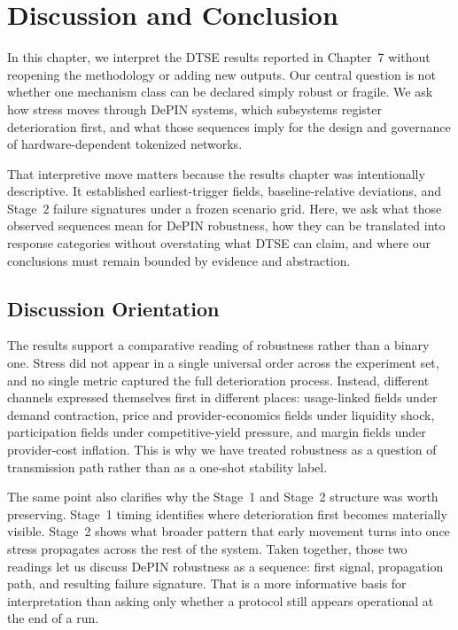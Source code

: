 \section{Discussion and Conclusion}
\label{sec:discussion}

In this chapter, we interpret the DTSE results reported in Chapter~7 without reopening the methodology or adding new outputs. Our central question is not whether one mechanism class can be declared simply robust or fragile. We ask how stress moves through DePIN systems, which subsystems register deterioration first, and what those sequences imply for the design and governance of hardware-dependent tokenized networks.

That interpretive move matters because the results chapter was intentionally descriptive. It established earliest-trigger fields, baseline-relative deviations, and Stage~2 failure signatures under a frozen scenario grid. Here, we ask what those observed sequences mean for DePIN robustness, how they can be translated into response categories without overstating what DTSE can claim, and where our conclusions must remain bounded by evidence and abstraction.

\subsection{Discussion Orientation}
The results support a comparative reading of robustness rather than a binary one. Stress did not appear in a single universal order across the experiment set, and no single metric captured the full deterioration process. Instead, different channels expressed themselves first in different places: usage-linked fields under demand contraction, price and provider-economics fields under liquidity shock, participation fields under competitive-yield pressure, and margin fields under provider-cost inflation. This is why we have treated robustness as a question of transmission path rather than as a one-shot stability label.

The same point also clarifies why the Stage~1 and Stage~2 structure was worth preserving. Stage~1 timing identifies where deterioration first becomes materially visible. Stage~2 shows what broader pattern that early movement turns into once stress propagates across the rest of the system. Taken together, those two readings let us discuss DePIN robustness as a sequence: first signal, propagation path, and resulting failure signature. That is a more informative basis for interpretation than asking only whether a protocol still appears operational at the end of a run.

